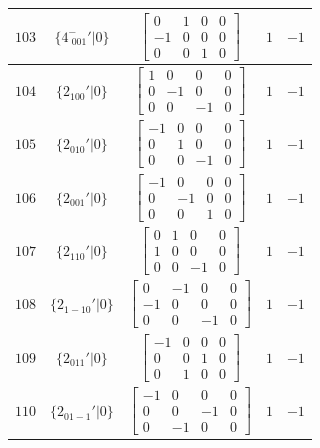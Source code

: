 \documentclass[fleqn,8pt]{jsarticle}
\begin{document}
\begin{longtable}{ccccc}
$ 103 $ & $ \{4^{-}_{\,\,001}{}'|0\} $ & $ \begin{bmatrix} 0 & 1 & 0 & 0 \\ -1 & 0 & 0 & 0 \\ 0 & 0 & 1 & 0 \end{bmatrix} $ & $ 1 $ & $ -1 $ \\ \hline
$ 104 $ & $ \{2{}_{100}{}'|0\} $ & $ \begin{bmatrix} 1 & 0 & 0 & 0 \\ 0 & -1 & 0 & 0 \\ 0 & 0 & -1 & 0 \end{bmatrix} $ & $ 1 $ & $ -1 $ \\ \hline
$ 105 $ & $ \{2{}_{010}{}'|0\} $ & $ \begin{bmatrix} -1 & 0 & 0 & 0 \\ 0 & 1 & 0 & 0 \\ 0 & 0 & -1 & 0 \end{bmatrix} $ & $ 1 $ & $ -1 $ \\ \hline
$ 106 $ & $ \{2{}_{001}{}'|0\} $ & $ \begin{bmatrix} -1 & 0 & 0 & 0 \\ 0 & -1 & 0 & 0 \\ 0 & 0 & 1 & 0 \end{bmatrix} $ & $ 1 $ & $ -1 $ \\ \hline
$ 107 $ & $ \{2{}_{110}{}'|0\} $ & $ \begin{bmatrix} 0 & 1 & 0 & 0 \\ 1 & 0 & 0 & 0 \\ 0 & 0 & -1 & 0 \end{bmatrix} $ & $ 1 $ & $ -1 $ \\ \hline
$ 108 $ & $ \{2{}_{1-10}{}'|0\} $ & $ \begin{bmatrix} 0 & -1 & 0 & 0 \\ -1 & 0 & 0 & 0 \\ 0 & 0 & -1 & 0 \end{bmatrix} $ & $ 1 $ & $ -1 $ \\ \hline
$ 109 $ & $ \{2{}_{011}{}'|0\} $ & $ \begin{bmatrix} -1 & 0 & 0 & 0 \\ 0 & 0 & 1 & 0 \\ 0 & 1 & 0 & 0 \end{bmatrix} $ & $ 1 $ & $ -1 $ \\ \hline
$ 110 $ & $ \{2{}_{01-1}{}'|0\} $ & $ \begin{bmatrix} -1 & 0 & 0 & 0 \\ 0 & 0 & -1 & 0 \\ 0 & -1 & 0 & 0 \end{bmatrix} $ & $ 1 $ & $ -1 $ \\ \hline

\end{longtable}
\end{document}
